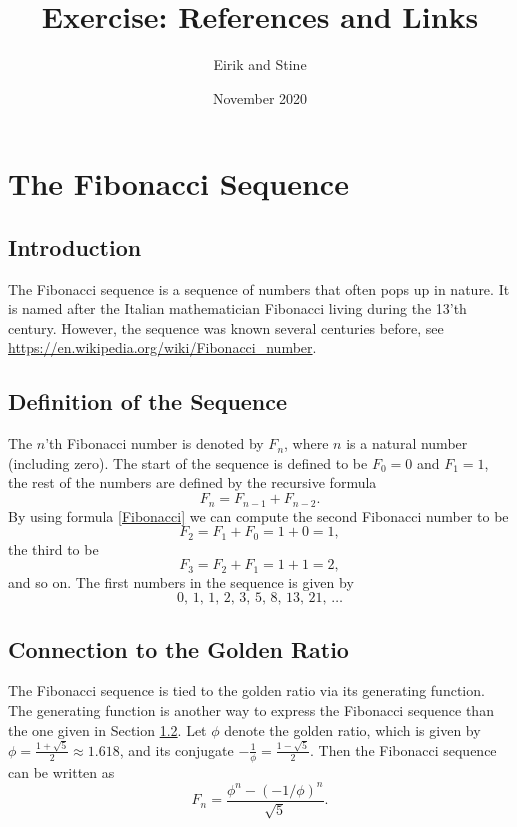 \documentclass{article}
\title{Exercise: References and Links}
\author{Eirik and Stine}
\date{November 2020}
\begin{document}
\maketitle

\section{The Fibonacci Sequence}
\subsection{Introduction}
The Fibonacci sequence is a sequence of numbers that often pops up in nature. It is named after the Italian mathematician Fibonacci living during the 13'th century. However, the sequence was known several centuries before, see \url{https://en.wikipedia.org/wiki/Fibonacci_number}.

\subsection{Definition of the Sequence}\label{Definition}
The $n$'th Fibonacci number is denoted by $F_{n}$, where $n$ is a natural number (including zero). The start of the sequence is defined to be $F_{0}=0$ and $F_{1}=1$, the rest of the numbers are defined by the recursive formula 
\begin{equation}\label{Fibonacci}
    F_{n}=F_{n-1}+F_{n-2}.
\end{equation}
By using formula \eqref{Fibonacci} we can compute the second Fibonacci number to be 
\[F_2=F_1+F_0=1+0=1,\]
the third to be 
\[F_3=F_2+F_1=1+1=2,\]
and so on.
The first numbers in the sequence is given by
\[0,\, 1,\, 1,\, 2,\, 3,\, 5,\, 8,\, 13,\, 21,\, \dots \]
\subsection{Connection to the Golden Ratio}
The Fibonacci sequence is tied to the golden ratio via its generating function. The generating function is another way to express the Fibonacci sequence than the one given in Section \ref{Definition}. Let $\phi$ denote the golden ratio, which is given by $\phi=\frac{1+\sqrt{5}}{2} \approx 1.618$, and its conjugate $-\frac{1}{\phi}=\frac{1-\sqrt{5}}{2}$. Then the Fibonacci sequence can be written as 
\[F_n = \frac{\phi^n-(-1/\phi)^n}{\sqrt{5}}.\]
\end{document}
